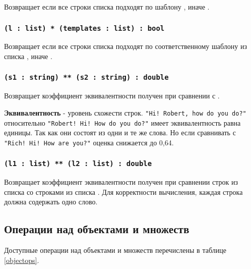 Возвращает \true{} если все строки списка  подходят по шаблону , иначе \false{}.

\subsubsection{\lstinline|(l : list) * (templates : list) : bool|}

Возвращает \true{} если все строки списка  подходят по соответственному шаблону из списка , иначе \false{}.

\subsubsection{\lstinline|(s1 : string) ** (s2 : string) : double|}

Возвращает коэффициент эквивалентности получен при сравнении  с .

{\bf Эквивалентность} - уровень схожести строк. \lstinline|"Hi! Robert, how do you do?"| относительно \lstinline|"Robert! Hi! How do you do?"| имеет эквивалентность равна единицы. Так как они состоят из одни и те же слова. Но если сравнивать с  \lstinline|"Rich! Hi! How are you?"| оценка снижается до 0,64.

\subsubsection{\lstinline|(l1 : list) ** (l2 : list) : double|}

Возвращает коэффициент эквивалентности получен при сравнении строк из списка  со строками из списка .
Для корректности вычисления, каждая строка должна содержать одно слово.

\subsection{Операции над объектами и множеств}

Доступные операции над объектами и множеств перечислены в таблице \ref{objectops}.

